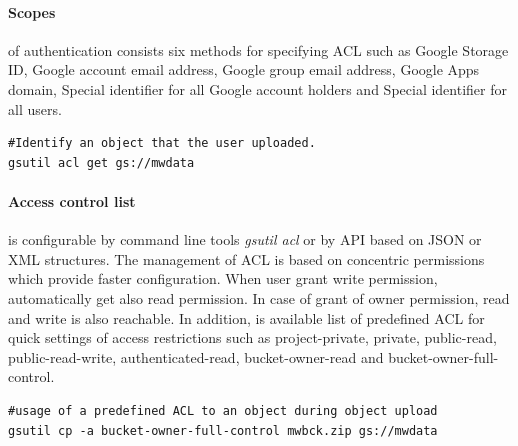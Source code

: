 \documentclass[a4paper,12pt,oneside]{report}
\begin{document}
\paragraph{Scopes}\label{par:scopes}of authentication consists six methods for 
specifying ACL such as  Google Storage ID, Google account email address, Google 
group email address, Google Apps domain, Special identifier for all Google 
account holders and Special identifier for all users.

\begin{footnotesize}
\begin{lstlisting}[style=mybash]
#Identify an object that the user uploaded.
gsutil acl get gs://mwdata
\end{lstlisting}\end{footnotesize}
 

\paragraph{Access control list} is configurable by command line tools \textit{gsutil acl} 
or by API based on JSON or XML structures. The management of ACL is based on concentric 
permissions which provide faster configuration. When user grant 
write permission, automatically get also read permission. In case of grant of owner 
permission, read and write is also reachable. In addition, is available 
list of predefined ACL for quick settings of access restrictions such as project-private, 
private, public-read, public-read-write, authenticated-read, 
bucket-owner-read and bucket-owner-full-control.

\begin{footnotesize}
\begin{lstlisting}[style=mybash]
#usage of a predefined ACL to an object during object upload
gsutil cp -a bucket-owner-full-control mwbck.zip gs://mwdata
\end{lstlisting}
\end{footnotesize}
 

\end{document}
